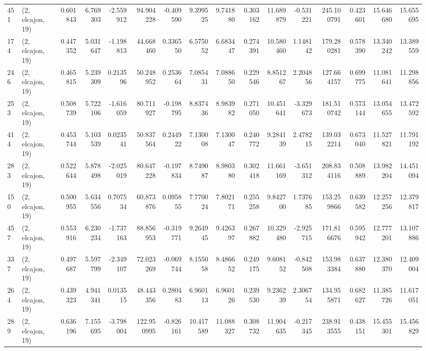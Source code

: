 \begin{tabular}{llrrrrrrrrrrrrrr}
451 &  (2, elcajon, 19) &   0.601843 &   6.769303 &  -2.559912 &    94.904228 &  -0.409590 &   9.399525 &   9.741880 &  0.303162 &  11.689879 &  -0.531221 &   245.100791 &  0.423601 &  15.646680 &  15.655695 \\
174 &  (2, elcajon, 19) &   0.447352 &   5.031647 &  -1.198813 &    44.668460 &   0.336550 &   6.575052 &   6.683447 &  0.274391 &  10.580460 &   1.148142 &   179.280281 &  0.578390 &  13.340242 &  13.389559 \\
246 &  (2, elcajon, 19) &   0.465815 &   5.239309 &   0.213596 &    50.248952 &   0.253664 &   7.085431 &   7.088650 &  0.229546 &   8.851267 &   2.204856 &   127.664157 &  0.699775 &  11.081641 &  11.298856 \\
253 &  (2, elcajon, 19) &   0.508739 &   5.722106 &  -1.616059 &    80.711927 &  -0.198795 &   8.837436 &   8.983982 &  0.271050 &  10.451641 &  -3.329673 &   181.510742 &  0.573144 &  13.054655 &  13.472592 \\
414 &  (2, elcajon, 19) &   0.453744 &   5.103539 &   0.023541 &    50.837564 &   0.244922 &   7.130008 &   7.130047 &  0.240772 &   9.284139 &   2.478215 &   139.032214 &  0.673040 &  11.527821 &  11.791192 \\
283 &  (2, elcajon, 19) &   0.522644 &   5.878498 &  -2.025019 &    80.647228 &  -0.197834 &   8.749087 &   8.980380 &  0.302418 &  11.661169 &  -3.651312 &   208.834116 &  0.508889 &  13.982204 &  14.451094 \\
150 &  (2, elcajon, 19) &   0.500955 &   5.634556 &   0.707534 &    60.873876 &   0.095855 &   7.770024 &   7.802171 &  0.255258 &   9.842700 &   1.737685 &   153.259866 &  0.639582 &  12.257256 &  12.379817 \\
457 &  (2, elcajon, 19) &   0.553916 &   6.230234 &  -1.737163 &    88.856953 &  -0.319771 &   9.264945 &   9.426397 &  0.267882 &  10.329480 &  -2.925715 &   171.816676 &  0.595942 &  12.777201 &  13.107886 \\
337 &  (2, elcajon, 19) &   0.497687 &   5.597799 &  -2.349107 &    72.023269 &  -0.069744 &   8.155058 &   8.486652 &  0.249175 &   9.608152 &  -0.842508 &   153.983384 &  0.637880 &  12.380370 &  12.409004 \\
264 &  (2, elcajon, 19) &   0.439323 &   4.941341 &   0.013515 &    48.443356 &   0.280483 &   6.960113 &   6.960126 &  0.239530 &   9.236239 &   2.306754 &   134.955871 &  0.682627 &  11.385726 &  11.617051 \\
289 &  (2, elcajon, 19) &   0.636196 &   7.155695 &  -3.798004 &   122.950995 &  -0.826161 &  10.417589 &  11.088327 &  0.308732 &  11.904635 &  -0.217345 &   238.913555 &  0.438151 &  15.455301 &  15.456829 \\

\end{tabular}
